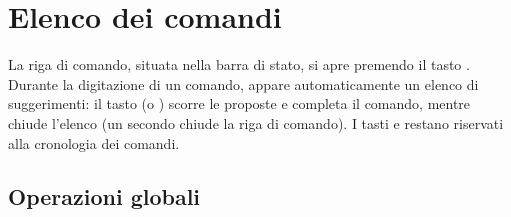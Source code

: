 \documentclass[letterpaper,10pt,italian]{sphinxmanual}
\begin{document}
\sphinxstepscope


\section{Elenco dei comandi}
\label{\detokenize{cmd_mode:liste-des-commandes}}\label{\detokenize{cmd_mode:cmd-mode}}\label{\detokenize{cmd_mode::doc}}
\sphinxAtStartPar
La riga di comando, situata nella barra di stato, si apre premendo il tasto . Durante la digitazione di un comando, appare automaticamente un elenco di suggerimenti: il tasto  (o ) scorre le proposte e completa il comando, mentre  chiude l’elenco (un secondo  chiude la riga di comando). I tasti  e  restano riservati alla cronologia dei comandi.


\subsection{Operazioni globali}
\label{\detokenize{cmd_mode:operations-globales}}\label{\detokenize{cmd_mode:cmd-global}}
\end{document}
